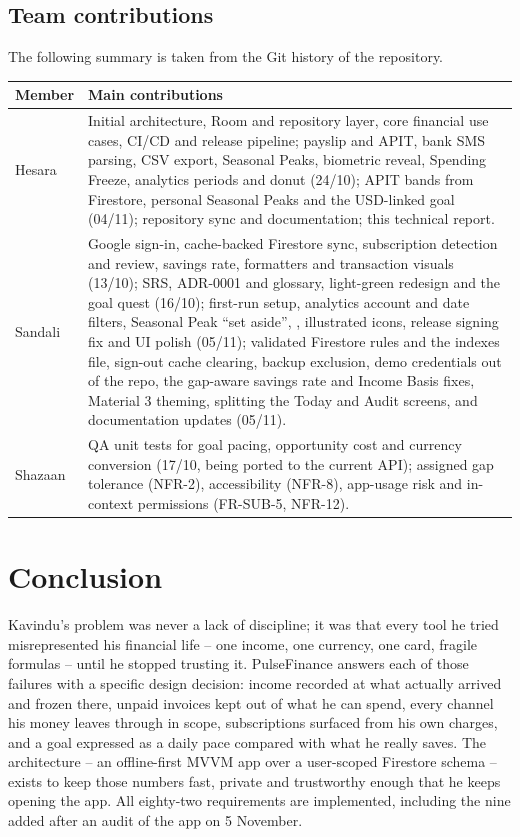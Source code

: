 \documentclass[11pt,a4paper]{article}
\begin{document}
\subsection{Team contributions}
The following summary is taken from the Git history of the repository.

\begin{tabularx}{\textwidth}{|>{\raggedright\arraybackslash}p{2.2cm}|L|}
\hline
\textbf{Member} & \textbf{Main contributions}\\
\hline
Hesara & Initial architecture, Room and repository layer, core financial use cases, CI/CD and release pipeline; payslip and APIT, bank SMS parsing, CSV export, Seasonal Peaks, biometric reveal, Spending Freeze, analytics periods and donut (24/10); APIT bands from Firestore, personal Seasonal Peaks and the USD-linked goal (04/11); repository sync and documentation; this technical report.\\
Sandali & Google sign-in, cache-backed Firestore sync, subscription detection and review, savings rate, formatters and transaction visuals (13/10); SRS, ADR-0001 and glossary, light-green redesign and the goal quest (16/10); first-run setup, analytics account and date filters, Seasonal Peak ``set aside'', , illustrated icons, release signing fix and UI polish (05/11); validated Firestore rules and the indexes file, sign-out cache clearing, backup exclusion, demo credentials out of the repo, the gap-aware savings rate and Income Basis fixes, Material 3 theming, splitting the Today and Audit screens, and documentation updates (05/11).\\
Shazaan & QA unit tests for goal pacing, opportunity cost and currency conversion (17/10, being ported to the current API); assigned gap tolerance (NFR-2), accessibility (NFR-8), app-usage risk and in-context permissions (FR-SUB-5, NFR-12).\\
\hline
\end{tabularx}

\section{Conclusion}
Kavindu's problem was never a lack of discipline; it was that every tool he tried misrepresented his financial life -- one income, one currency, one card, fragile formulas -- until he stopped trusting it. PulseFinance answers each of those failures with a specific design decision: income recorded at what actually arrived and frozen there, unpaid invoices kept out of what he can spend, every channel his money leaves through in scope, subscriptions surfaced from his own charges, and a goal expressed as a daily pace compared with what he really saves. The architecture -- an offline-first MVVM app over a user-scoped Firestore schema -- exists to keep those numbers fast, private and trustworthy enough that he keeps opening the app. All eighty-two requirements are implemented, including the nine added after an audit of the app on 5 November.
\end{document}
